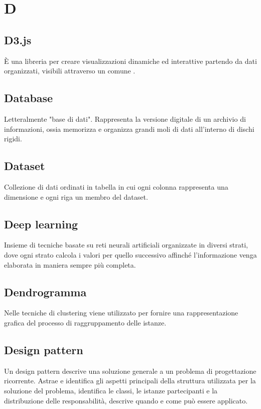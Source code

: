 \section*{D}
\markright{}

\subsection*{D3.js}
È una libreria  per creare visualizzazioni dinamiche ed interattive partendo da dati organizzati, visibili attraverso un comune .

\subsection*{Database}
Letteralmente "base di dati". Rappresenta la versione digitale di un archivio di informazioni, ossia memorizza e organizza grandi moli di dati all'interno di dischi rigidi.

\subsection*{Dataset}
Collezione di dati ordinati in tabella in cui ogni colonna rappresenta una dimensione e ogni riga un membro del dataset.

\subsection*{Deep learning}
Insieme di tecniche basate su reti neurali artificiali organizzate in diversi strati, dove ogni strato calcola i valori per quello successivo affinché l'informazione venga elaborata in maniera sempre più completa.

\subsection*{Dendrogramma}
Nelle tecniche di clustering viene utilizzato per fornire una rappresentazione grafica del processo di raggruppamento delle istanze.

\subsection*{Design pattern}
Un design pattern descrive una soluzione generale a un problema di progettazione ricorrente. Astrae e identifica gli aspetti principali della struttura utilizzata per la soluzione del problema, identifica le classi, le istanze partecipanti e la distribuzione delle responsabilità, descrive quando e come può essere applicato. 

